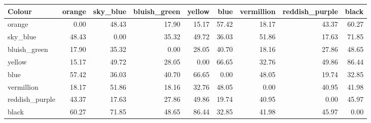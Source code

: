 \begin{tabular}{lrrrrrrrr}
\toprule
Colour & orange & sky\_blue & bluish\_green & yellow & blue & vermillion & reddish\_purple & black \\
\midrule
orange & 0.00 & 48.43 & 17.90 & 15.17 & 57.42 & 18.17 & 43.37 & 60.27 \\
sky\_blue & 48.43 & 0.00 & 35.32 & 49.72 & 36.03 & 51.86 & 17.63 & 71.85 \\
bluish\_green & 17.90 & 35.32 & 0.00 & 28.05 & 40.70 & 18.16 & 27.86 & 48.65 \\
yellow & 15.17 & 49.72 & 28.05 & 0.00 & 66.65 & 32.76 & 49.86 & 86.44 \\
blue & 57.42 & 36.03 & 40.70 & 66.65 & 0.00 & 48.05 & 19.74 & 32.85 \\
vermillion & 18.17 & 51.86 & 18.16 & 32.76 & 48.05 & 0.00 & 40.95 & 41.98 \\
reddish\_purple & 43.37 & 17.63 & 27.86 & 49.86 & 19.74 & 40.95 & 0.00 & 45.97 \\
black & 60.27 & 71.85 & 48.65 & 86.44 & 32.85 & 41.98 & 45.97 & 0.00 \\
\bottomrule
\end{tabular}

